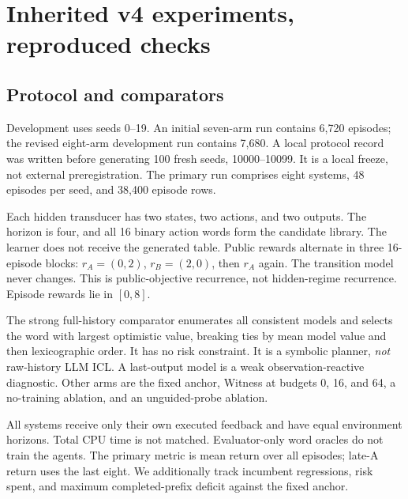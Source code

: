 \documentclass[10pt,twocolumn]{article}
\begin{document}
\section{Inherited v4 experiments, reproduced checks}
\subsection{Protocol and comparators}
Development uses seeds 0--19. An initial seven-arm run contains 6,720 episodes;
the revised eight-arm development run contains 7,680. A local protocol record
was written before generating 100 fresh seeds, 10000--10099. It is a local
freeze, not external preregistration. The primary run comprises eight systems,
48 episodes per seed, and 38,400 episode rows.

Each hidden transducer has two states, two actions, and two outputs. The horizon
is four, and all 16 binary action words form the candidate library. The learner
does not receive the generated table. Public rewards alternate in three
16-episode blocks: $r_A=(0,2)$, $r_B=(2,0)$, then $r_A$ again. The transition
model never changes. This is public-objective recurrence, not hidden-regime
recurrence. Episode rewards lie in $[0,8]$.

The strong full-history comparator enumerates all consistent models and selects
the word with largest optimistic value, breaking ties by mean model value and
then lexicographic order. It has no risk constraint. It is a symbolic planner,
\emph{not} raw-history LLM ICL. A last-output model is a weak observation-reactive
diagnostic. Other arms are the fixed anchor, Witness at budgets 0, 16, and 64,
a no-training ablation, and an unguided-probe ablation.

All systems receive only their own executed feedback and have equal environment
horizons. Total CPU time is not matched. Evaluator-only word oracles do not train
the agents. The primary metric is mean return over all episodes; late-A return
uses the last eight. We additionally track incumbent regressions, risk spent,
and maximum completed-prefix deficit against the fixed anchor.

\begin{table}[t]
\centering

\caption{Executed primary study: 100 fresh seeds, eight systems, 48 episodes,
38,400 rows. Mean and late-A values are rewards, not percentages. Maximum deficit
is the worst completed-prefix anchor deficit across all seeds. The strong
full-history planner is symbolic, not an LLM ICL baseline.}
\label{tab:main}
\end{table}
\end{document}
